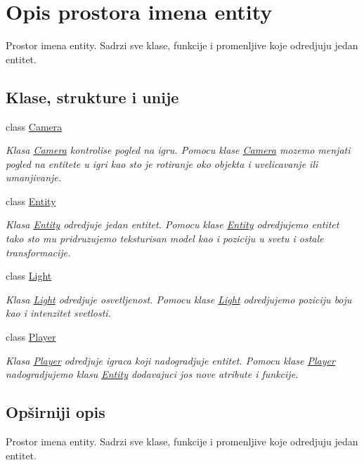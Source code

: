 \hypertarget{namespaceentity}{}\section{Opis prostora imena entity}
\label{namespaceentity}


Prostor imena entity. Sadrzi sve klase, funkcije i promenljive koje odredjuju jedan entitet.  


\subsection*{Klase, strukture i unije}
\begin{DoxyCompactItemize}
\item 
class \hyperlink{classentity_1_1Camera}{Camera}
\begin{DoxyCompactList}\small\item\em Klasa \hyperlink{classentity_1_1Camera}{Camera} kontrolise pogled na igru. Pomocu klase \hyperlink{classentity_1_1Camera}{Camera} mozemo menjati pogled na entitete u igri kao sto je rotiranje oko objekta i uvelicavanje ili umanjivanje. \end{DoxyCompactList}\item 
class \hyperlink{classentity_1_1Entity}{Entity}
\begin{DoxyCompactList}\small\item\em Klasa \hyperlink{classentity_1_1Entity}{Entity} odredjuje jedan entitet. Pomocu klase \hyperlink{classentity_1_1Entity}{Entity} odredjujemo entitet tako sto mu pridruzujemo teksturisan model kao i poziciju u svetu i ostale transformacije. \end{DoxyCompactList}\item 
class \hyperlink{classentity_1_1Light}{Light}
\begin{DoxyCompactList}\small\item\em Klasa \hyperlink{classentity_1_1Light}{Light} odredjuje osvetljenost. Pomocu klase \hyperlink{classentity_1_1Light}{Light} odredjujemo poziciju boju kao i intenzitet svetlosti. \end{DoxyCompactList}\item 
class \hyperlink{classentity_1_1Player}{Player}
\begin{DoxyCompactList}\small\item\em Klasa \hyperlink{classentity_1_1Player}{Player} odredjuje igraca koji nadogradjuje entitet. Pomocu klase \hyperlink{classentity_1_1Player}{Player} nadogradjujemo klasu \hyperlink{classentity_1_1Entity}{Entity} dodavajuci jos nove atribute i funkcije. \end{DoxyCompactList}\end{DoxyCompactItemize}


\subsection{Opširniji opis}
Prostor imena entity. Sadrzi sve klase, funkcije i promenljive koje odredjuju jedan entitet. 